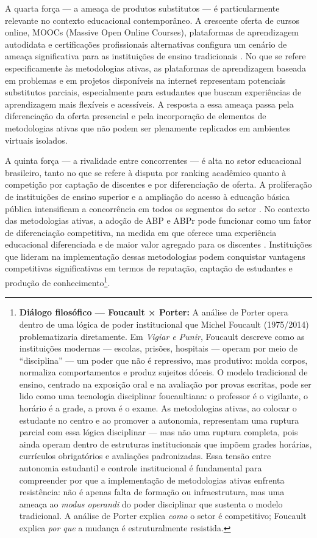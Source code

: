 A quarta força — a ameaça de produtos substitutos — é particularmente relevante no contexto educacional contemporâneo. A crescente oferta de cursos online, MOOCs (Massive Open Online Courses), plataformas de aprendizagem autodidata e certificações profissionais alternativas configura um cenário de ameaça significativa para as instituições de ensino tradicionais \cite{SELWYN2022}. No que se refere especificamente às metodologias ativas, as plataformas de aprendizagem baseada em problemas e em projetos disponíveis na internet representam potenciais substitutos parciais, especialmente para estudantes que buscam experiências de aprendizagem mais flexíveis e acessíveis. A resposta a essa ameaça passa pela diferenciação da oferta presencial e pela incorporação de elementos de metodologias ativas que não podem ser plenamente replicados em ambientes virtuais isolados.

A quinta força — a rivalidade entre concorrentes — é alta no setor educacional brasileiro, tanto no que se refere à disputa por ranking acadêmico quanto à competição por captação de discentes e por diferenciação de oferta. A proliferação de instituições de ensino superior e a ampliação do acesso à educação básica pública intensificam a concorrência em todos os segmentos do setor \cite{PORTER1980}. No contexto das metodologias ativas, a adoção de ABP e ABPr pode funcionar como um fator de diferenciação competitiva, na medida em que oferece uma experiência educacional diferenciada e de maior valor agregado para os discentes \cite{BACICH2018}. Instituições que lideram na implementação dessas metodologias podem conquistar vantagens competitivas significativas em termos de reputação, captação de estudantes e produção de conhecimento\footnote{\textbf{Diálogo filosófico — Foucault × Porter:} A análise de Porter opera dentro de uma lógica de poder institucional que Michel Foucault (1975/2014) problematizaria diretamente. Em \textit{Vigiar e Punir}, Foucault descreve como as instituições modernas — escolas, prisões, hospitais — operam por meio de ``disciplina'' — um poder que não é repressivo, mas produtivo: molda corpos, normaliza comportamentos e produz sujeitos dóceis. O modelo tradicional de ensino, centrado na exposição oral e na avaliação por provas escritas, pode ser lido como uma tecnologia disciplinar foucaultiana: o professor é o vigilante, o horário é a grade, a prova é o exame. As metodologias ativas, ao colocar o estudante no centro e ao promover a autonomia, representam uma ruptura parcial com essa lógica disciplinar — mas não uma ruptura completa, pois ainda operam dentro de estruturas institucionais que impõem grades horárias, currículos obrigatórios e avaliações padronizadas. Essa tensão entre autonomia estudantil e controle institucional é fundamental para compreender por que a implementação de metodologias ativas enfrenta resistência: não é apenas falta de formação ou infraestrutura, mas uma ameaça ao \textit{modus operandi} do poder disciplinar que sustenta o modelo tradicional. A análise de Porter explica \textit{como} o setor é competitivo; Foucault explica \textit{por que} a mudança é estruturalmente resistida.}.

